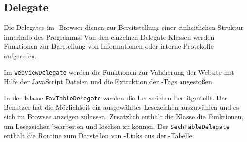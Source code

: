 
\subsection{Delegate}
Die Delegates im \SECH-Browser dienen zur Bereitstellung einer einheitlichen Struktur innerhalb des Programms. Von den einzelnen Delegate Klassen werden Funktionen zur Darstellung von Informationen oder interne Protokolle aufgerufen.

Im \lstinline|WebViewDelegate| werden die Funktionen zur Validierung der Website mit Hilfe der JavaScript Dateien und die Extraktion der \SEARCH-Tags angestoßen.

In der Klasse \lstinline|FavTableDelegate| werden die Lesezeichen bereitgestellt. Der Benutzer hat die Möglichkeit ein ausgewähltes Lesezeichen auszuwählen und es sich im Browser anzeigen zulassen. Zusätzlich enthält die Klasse die Funktionen, um Lesezeichen bearbeiten und löschen zu können. Der \lstinline|SechTableDelegate| enthält die Routine zum Darstellen von \SEARCH-Links aus der \SECH-Tabelle. 